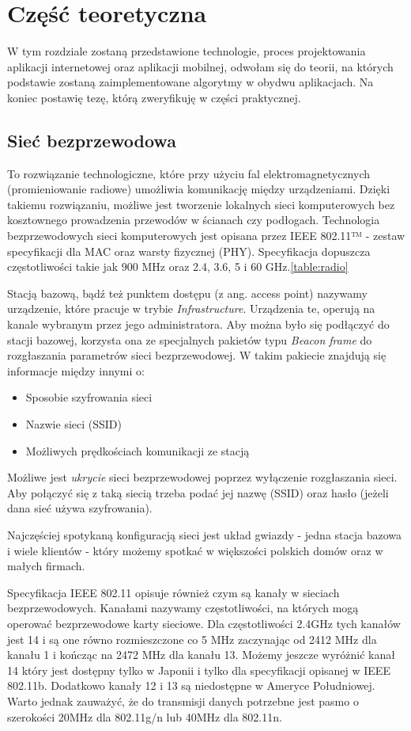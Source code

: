 \chapter{Część teoretyczna}

W tym rozdziale zostaną przedstawione technologie, proces projektowania aplikacji internetowej oraz aplikacji mobilnej, odwołam się do teorii, na których podstawie zostaną zaimplementowane algorytmy w obydwu aplikacjach. Na koniec postawię tezę, którą zweryfikuję w części praktycznej.

\section{Sieć bezprzewodowa}
To rozwiązanie technologiczne, które przy użyciu fal elektromagnetycznych (promieniowanie radiowe) umożliwia komunikację między urządzeniami. Dzięki takiemu rozwiązaniu, możliwe jest tworzenie lokalnych sieci komputerowych bez kosztownego prowadzenia przewodów w ścianach czy podłogach. Technologia bezprzewodowych sieci komputerowych jest opisana przez IEEE 802.11™ - zestaw specyfikacji dla MAC oraz warsty fizycznej (PHY). Specyfikacja dopuszcza częstotliwości takie jak 900 MHz oraz 2.4, 3.6, 5 i 60 GHz.\ref{table:radio}

Stacją bazową, bądź też punktem dostępu (z ang. access point) nazywamy urządzenie, które pracuje w trybie \textit{Infrastructure}. Urządzenia te, operują na kanale wybranym przez jego administratora. Aby można było się podłączyć do stacji bazowej, korzysta ona ze specjalnych pakietów typu \textit{Beacon frame} do rozgłaszania parametrów sieci bezprzewodowej. W takim pakiecie znajdują się informacje między innymi o:
\begin{itemize}
    \item Sposobie szyfrowania sieci
    \item Nazwie sieci (SSID)
    \item Możliwych prędkościach komunikacji ze stacją
\end{itemize}

Możliwe jest \textit{ukrycie} sieci bezprzewodowej poprzez wyłączenie rozgłaszania sieci. Aby połączyć się z taką siecią trzeba podać jej nazwę (SSID) oraz hasło (jeżeli dana sieć używa szyfrowania).

Najczęściej spotykaną konfiguracją sieci jest układ gwiazdy - jedna stacja bazowa i wiele klientów - który możemy spotkać w większości polskich domów oraz w małych firmach. 

Specyfikacja IEEE 802.11 opisuje również czym są kanały w sieciach bezprzewodowych. Kanałami nazywamy częstotliwości, na których mogą operować bezprzewodowe karty sieciowe. Dla częstotliwości 2.4GHz tych kanałów jest 14 i są one równo rozmieszczone co 5 MHz zaczynając od 2412 MHz dla kanału 1 i kończąc na 2472 MHz dla kanału 13. Możemy jeszcze wyróżnić kanał 14 który jest dostępny tylko w Japonii i tylko dla specyfikacji opisanej w IEEE 802.11b. Dodatkowo kanały 12 i 13 są niedostępne w Ameryce Południowej. Warto jednak zauważyć, że do transmisji danych potrzebne jest pasmo o szerokości 20MHz dla 802.11g/n lub 40MHz dla 802.11n.

